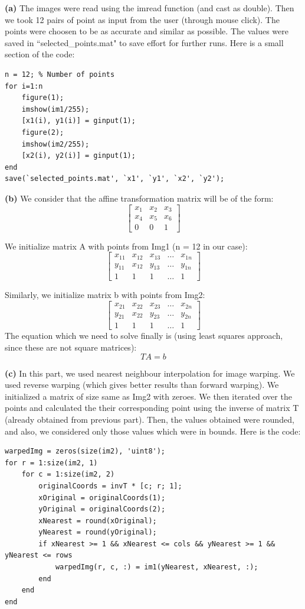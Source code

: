 \documentclass[12pt]{article}
\begin{document}
\textbf{(a)} The images were read using the imread function (and cast as double). Then we took 12 pairs of point as input from the user (through mouse click). The points were choosen to be as accurate and similar as possible. The values were saved in ``selected\_points.mat" to save effort for further runs. Here is a small section of the code:
\begin{verbatim}
n = 12; % Number of points
for i=1:n
    figure(1); 
    imshow(im1/255); 
    [x1(i), y1(i)] = ginput(1);
    figure(2); 
    imshow(im2/255); 
    [x2(i), y2(i)] = ginput(1);
end
save(`selected_points.mat', `x1', `y1', `x2', `y2');
\end{verbatim}


\textbf{(b)}
We consider that the affine transformation matrix will be of the form:
\[
    \begin{bmatrix}
        x_1 & x_2 & x_3 \\
        x_4 & x_5 & x_6 \\
        0 & 0 & 1
    \end{bmatrix}
\]

We initialize matrix A with points from Img1 (n = 12 in our case):
\[
    \begin{bmatrix}
        x_{11} & x_{12} & x_{13} & \dots & x_{1n} \\
        y_{11} & x_{12} & y_{13} & \dots & y_{1n} \\
        1 & 1 & 1 & \dots & 1
    \end{bmatrix}
\]

Similarly, we initialize matrix b with points from Img2:
\[
    \begin{bmatrix}
        x_{21} & x_{22} & x_{23} & \dots & x_{2n} \\
        y_{21} & x_{22} & y_{23} & \dots & y_{2n} \\
        1 & 1 & 1 & \dots & 1
    \end{bmatrix}
\]
The equation which we need to solve finally is (using least squares approach, since these are not square matrices):
\[TA = b\]


\textbf{(c)}
In this part, we used nearest neighbour interpolation for image warping. We used reverse warping (which gives better results than forward warping). We initialized a matrix of size same as Img2 with zeroes. We then iterated over the points and calculated the their corresponding point using the inverse of matrix T (already obtained from previous part). Then, the values obtained were rounded, and also, we considered only those values which were in bounds. Here is the code:
\begin{verbatim}
warpedImg = zeros(size(im2), 'uint8');
for r = 1:size(im2, 1)
    for c = 1:size(im2, 2)
        originalCoords = invT * [c; r; 1];
        xOriginal = originalCoords(1);
        yOriginal = originalCoords(2);
        xNearest = round(xOriginal);
        yNearest = round(yOriginal);
        if xNearest >= 1 && xNearest <= cols && yNearest >= 1 && yNearest <= rows
            warpedImg(r, c, :) = im1(yNearest, xNearest, :);
        end
    end
end
\end{verbatim}
\end{document}
